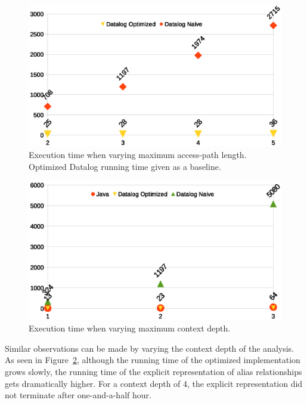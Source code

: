 \begin{figure}[htp]
\centering
\includegraphics[clip,width=\linewidth]{assets/must-data/length.eps}
\caption[Execution times when varying max access-path length]{Execution time when varying maximum access-path length. Optimized Datalog running time given as a baseline.}
\label{fig:must-data:aplength-chart}
\end{figure}



\begin{figure}[h!tp]
\centering
\includegraphics[clip,width=\linewidth]{assets/must-data/depth.eps}
\caption[Execution times when varying max context depth]{Execution time when varying maximum context depth.}
\label{fig:must-data:ctxdepth-chart}
\end{figure}

Similar observations can be made by varying the context depth of the analysis. As seen in Figure~\ref{fig:must-data:ctxdepth-chart}, although the running time of the optimized implementation grows slowly, the running time of the explicit representation of alias relationships gets dramatically higher. For a context depth of 4, the explicit representation did not terminate after one-and-a-half hour.

